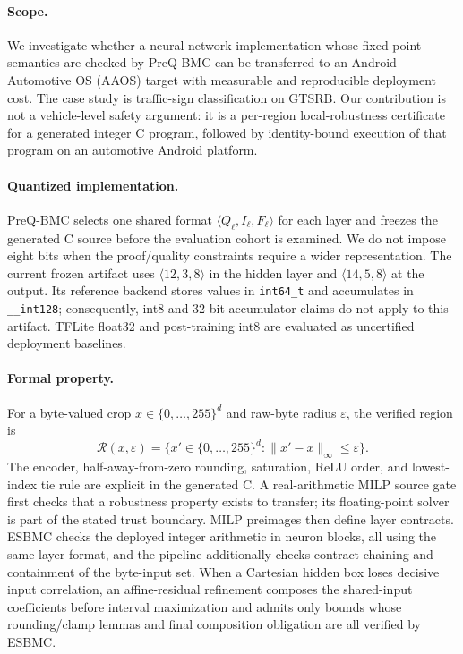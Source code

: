 \paragraph{Scope.}
We investigate whether a neural-network implementation whose fixed-point
semantics are checked by PreQ-BMC can be transferred to an Android Automotive
OS (AAOS) target with measurable and reproducible deployment cost.  The case
study is traffic-sign classification on GTSRB.  Our contribution is not a
vehicle-level safety argument: it is a per-region local-robustness certificate
for a generated integer C program, followed by identity-bound execution of that
program on an automotive Android platform.

\paragraph{Quantized implementation.}
PreQ-BMC selects one shared format $\langle Q_\ell,I_\ell,F_\ell\rangle$ for
each layer and freezes the generated C source before the evaluation cohort is
examined.  We do not impose eight bits when the proof/quality constraints
require a wider representation.  The current frozen artifact uses
$\langle12,3,8\rangle$ in the hidden layer and
$\langle14,5,8\rangle$ at the output.  Its reference backend stores values in
\texttt{int64\_t} and accumulates in \texttt{\_\_int128}; consequently, int8
and 32-bit-accumulator claims do not apply to this artifact.  TFLite float32 and
post-training int8 are evaluated as uncertified deployment baselines.

\paragraph{Formal property.}
For a byte-valued crop $x\in\{0,\ldots,255\}^{d}$ and raw-byte radius
$\varepsilon$, the verified region is
\[
  \mathcal R(x,\varepsilon)=
  \{x'\in\{0,\ldots,255\}^{d}:\lVert x'-x\rVert_\infty\leq\varepsilon\}.
\]
The encoder, half-away-from-zero rounding, saturation, ReLU order, and
lowest-index tie rule are explicit in the generated C.  A real-arithmetic MILP
source gate first checks that a robustness property exists to transfer; its
floating-point solver is part of the stated trust boundary.  MILP preimages then
define layer contracts.  ESBMC checks the deployed integer arithmetic in neuron
blocks, all using the same layer format, and the pipeline additionally checks
contract chaining and containment of the byte-input set.  When a Cartesian
hidden box loses decisive input correlation, an affine-residual refinement
composes the shared-input coefficients before interval maximization and admits
only bounds whose rounding/clamp lemmas and final composition obligation are
all verified by ESBMC.

